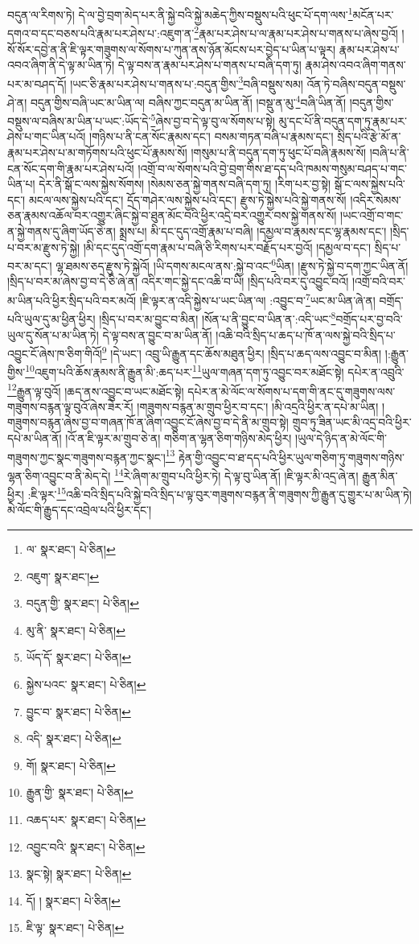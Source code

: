 བདུན་ལ་རིགས་ཏེ། དེ་ལ་བྱེ་བྲག་མེད་པར་ནི་སྐྱེ་བའི་སྐྱེ་མཆེད་ཀྱིས་བསྡུས་པའི་ཕུང་པོ་དག་ལས་\footnote{ལ་  སྣར་ཐང་།  པེ་ཅིན། }མངོན་པར་དགའ་བ་དང་བཅས་པའི་རྣམ་པར་ཤེས་པ་:འཇུག་ན་\footnote{འཇུག་  སྣར་ཐང་། }རྣམ་པར་ཤེས་པ་ལ་རྣམ་པར་ཤེས་པ་གནས་པ་ཞེས་བྱའོ། །སོ་སོར་དབྱེ་ན་ནི་ཇི་ལྟར་གཟུགས་ལ་སོགས་པ་ཀུན་ནས་ཉོན་མོངས་པར་བྱེད་པ་ཡིན་པ་ལྟར། རྣམ་པར་ཤེས་པ་འབའ་ཞིག་ནི་དེ་ལྟ་མ་ཡིན་ཏེ། དེ་ལྟ་བས་ན་རྣམ་པར་ཤེས་པ་གནས་པ་བཞི་དག་ཏུ། རྣམ་ཤེས་འབའ་ཞིག་གནས་པར་མ་བཤད་དོ། །ཡང་ཅི་རྣམ་པར་ཤེས་པ་གནས་པ་:བདུན་གྱིས་\footnote{བདུན་གྱི་  སྣར་ཐང་།  པེ་ཅིན། }བཞི་བསྡུས་སམ། འོན་ཏེ་བཞིས་བདུན་བསྡུས་ཤེ་ན། བདུན་གྱིས་བཞི་ཡང་མ་ཡིན་ལ། བཞིས་ཀྱང་བདུན་མ་ཡིན་ནོ། །བསྡུ་ན་མུ་\footnote{མུ་ནི་  སྣར་ཐང་།  པེ་ཅིན། }བཞི་ཡིན་ནོ། །བདུན་གྱིས་བསྡུས་ལ་བཞིས་མ་ཡིན་པ་ཡང་:ཡོད་དེ་\footnote{ཡོད་དོ་  སྣར་ཐང་།  པེ་ཅིན། }ཞེས་བྱ་བ་དེ་ལྟ་བུ་ལ་སོགས་པ་སྟེ། མུ་དང་པོ་ནི་བདུན་དག་ཏུ་རྣམ་པར་ཤེས་པ་གང་ཡིན་པའོ། །གཉིས་པ་ནི་ངན་སོང་རྣམས་དང་། བསམ་གཏན་བཞི་པ་རྣམས་དང་། སྲིད་པའི་རྩེ་མོ་ན་རྣམ་པར་ཤེས་པ་མ་གཏོགས་པའི་ཕུང་པོ་རྣམས་སོ། །གསུམ་པ་ནི་བདུན་དག་ཏུ་ཕུང་པོ་བཞི་རྣམས་སོ། །བཞི་པ་ནི་ངན་སོང་དག་གི་རྣམ་པར་ཤེས་པའོ། །འགྲོ་བ་ལ་སོགས་པའི་བྱེ་བྲག་གིས་ཐ་དད་པའི་ཁམས་གསུམ་བཤད་པ་གང་ཡིན་པ། དེར་ནི་སྒོ་ང་ལས་སྐྱེས་སོགས། །སེམས་ཅན་སྐྱེ་གནས་བཞི་དག་ཏུ། །རིག་པར་བྱ་སྟེ། སྒོ་ང་ལས་སྐྱེས་པའི་དང་། མངལ་ལས་སྐྱེས་པའི་དང་། དྲོད་གཤེར་ལས་སྐྱེས་པའི་དང་། རྫུས་ཏེ་སྐྱེས་པའི་སྐྱེ་གནས་སོ། །འདིར་སེམས་ཅན་རྣམས་འཆོལ་བར་འགྱུར་ཞིང་སྐྱེ་བ་ཐུན་མོང་བའི་ཕྱིར་འདྲེ་བར་འགྱུར་བས་སྐྱེ་གནས་སོ། །ཡང་འགྲོ་བ་གང་ན་སྐྱེ་གནས་དུ་ཞིག་ཡོད་ཅེ་ན། སྨྲས་པ། མི་དང་དུད་འགྲོ་རྣམ་པ་བཞི། །དམྱལ་བ་རྣམས་དང་ལྷ་རྣམས་དང་། །སྲིད་པ་བར་མ་རྫུས་ཏེ་སྐྱེ། །མི་དང་དུད་འགྲོ་དག་རྣམ་པ་བཞི་ཅི་རིགས་པར་བརྗོད་པར་བྱའོ། །དམྱལ་བ་དང་། སྲིད་པ་བར་མ་དང་། ལྷ་ཐམས་ཅད་རྫུས་ཏེ་སྐྱེའོ། །ཡི་དགས་མངལ་ནས་:སྐྱེ་བ་འང་\footnote{སྐྱེས་པའང་  སྣར་ཐང་།  པེ་ཅིན། }ཡིན། །རྫུས་ཏེ་སྐྱེ་བ་དག་ཀྱང་ཡིན་ནོ། །སྲིད་པ་བར་མ་ཞེས་བྱ་བ་དེ་ཅི་ཞེ་ན། འདིར་གང་སྐྱེ་དང་འཆི་བ་ཡི། །སྲིད་པའི་བར་དུ་འབྱུང་བའོ། །འགྲོ་བའི་བར་མ་ཡིན་པའི་ཕྱིར་སྲིད་པའི་བར་མའོ། །ཇི་ལྟར་ན་འདི་སྐྱེས་པ་ཡང་ཡིན་ལ། :འབྱུང་བ་\footnote{བྱུང་བ་  སྣར་ཐང་།  པེ་ཅིན། }ཡང་མ་ཡིན་ཞེ་ན། བགྲོད་པའི་ཡུལ་དུ་མ་ཕྱིན་ཕྱིར། །སྲིད་པ་བར་མ་བྱུང་བ་མིན། །སོན་པ་ནི་བྱུང་བ་ཡིན་ན་:འདི་ཡང་\footnote{འདི་  སྣར་ཐང་།  པེ་ཅིན། }བགྲོད་པར་བྱ་བའི་ཡུལ་དུ་སོན་པ་མ་ཡིན་ཏེ། དེ་ལྟ་བས་ན་བྱུང་བ་མ་ཡིན་ནོ། །འཆི་བའི་སྲིད་པ་ཆད་པ་ཁོ་ན་ལས་སྐྱེ་བའི་སྲིད་པ་འབྱུང་ངོ་ཞེས་ཁ་ཅིག་གིའོ།\footnote{གོ།  སྣར་ཐང་།  པེ་ཅིན། } །དེ་ཡང་། འབྲུ་ཡི་རྒྱུན་དང་ཆོས་མཐུན་ཕྱིར། །སྲིད་པ་ཆད་ལས་འབྱུང་བ་མིན། །:རྒྱུན་གྱིས་\footnote{རྒྱུན་གྱི་  སྣར་ཐང་།  པེ་ཅིན། }འཇུག་པའི་ཆོས་རྣམས་ནི་རྒྱུན་མི་:ཆད་པར་\footnote{འཆད་པར་  སྣར་ཐང་།  པེ་ཅིན། }ཡུལ་གཞན་དག་ཏུ་འབྱུང་བར་མཐོང་སྟེ། དཔེར་ན་འབྲུའི་\footnote{འབྱུང་བའི་  སྣར་ཐང་།  པེ་ཅིན། }རྒྱུན་ལྟ་བུའོ། །ཆད་ནས་འབྱུང་བ་ཡང་མཐོང་སྟེ། དཔེར་ན་མེ་ལོང་ལ་སོགས་པ་དག་གི་ནང་དུ་གཟུགས་ལས་གཟུགས་བརྙན་ལྟ་བུའོ་ཞེས་ཟེར་རོ། །གཟུགས་བརྙན་མ་གྲུབ་ཕྱིར་བ་དང་། །མི་འདྲའི་ཕྱིར་ན་དཔེ་མ་ཡིན། །གཟུགས་བརྙན་ཞེས་བྱ་བ་གཞན་ཁོ་ན་ཞིག་འབྱུང་ངོ་ཞེས་བྱ་བ་དེ་ནི་མ་གྲུབ་སྟེ། གྲུབ་ཏུ་ཟིན་ཡང་མི་འདྲ་བའི་ཕྱིར་དཔེ་མ་ཡིན་ནོ། །འོ་ན་ཇི་ལྟར་མ་གྲུབ་ཅེ་ན། གཅིག་ན་ལྷན་ཅིག་གཉིས་མེད་ཕྱིར། །ཡུལ་དེ་ཉིད་ན་མེ་ལོང་གི་གཟུགས་ཀྱང་སྣང་གཟུགས་བརྙན་ཀྱང་སྣང་།\footnote{སྣང་སྟེ།  སྣར་ཐང་།  པེ་ཅིན། } རྟེན་གྱི་འབྱུང་བ་ཐ་དད་པའི་ཕྱིར་ཡུལ་གཅིག་ཏུ་གཟུགས་གཉིས་ལྷན་ཅིག་འབྱུང་བ་ནི་མེད་དེ། \footnote{དོ། །   སྣར་ཐང་།  པེ་ཅིན། }རེ་ཞིག་མ་གྲུབ་པའི་ཕྱིར་ཏེ། དེ་ལྟ་བུ་ཡིན་ནོ། །ཇི་ལྟར་མི་འདྲ་ཞེ་ན། རྒྱུན་མིན་ཕྱིར། :ཇི་ལྟར་\footnote{ཇི་ལྟ་  སྣར་ཐང་།  པེ་ཅིན། }འཆི་བའི་སྲིད་པའི་སྐྱེ་བའི་སྲིད་པ་ལྟ་བུར་གཟུགས་བརྙན་ནི་གཟུགས་ཀྱི་རྒྱུན་དུ་གྱུར་པ་མ་ཡིན་ཏེ། མེ་ལོང་གི་རྒྱུད་དང་འབྲེལ་པའི་ཕྱིར་དང་། 